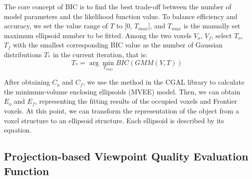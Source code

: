 The core concept of BIC is to find the best trade-off between the number of model parameters and the likelihood function value. 
To balance efficiency and accuracy, we set the value range of $T$ to [0, $T_{max}$], and $T_{max}$ is the manually set maximum ellipsoid number to be fitted. 
Among the two voxels $V_o$, $V_f$, select $T_o$, $T_f$ with the smallest corresponding BIC value as the number of Gaussian distributions $T_{*}$ in the current iteration, that is:
\begin{equation}
    T_{*} = \arg \min_{T_{max}}BIC(GMM(V,T))
\end{equation}

After obtaining $C_o$ and $C_f$, we use the method\cite{gartner1997smallest} in the CGAL library to calculate the minimum-volume enclosing ellipsoids (MVEE) model.
Then, we can obtain $E_o$ and $E_f$, representing the fitting results of the occupied voxels and Frontier voxels.
At this point, we can transform the representation of the object from a voxel structure to an ellipsoid structure.
Each ellipsoid is described by its equation.

\subsection{Projection-based Viewpoint Quality Evaluation Function}

